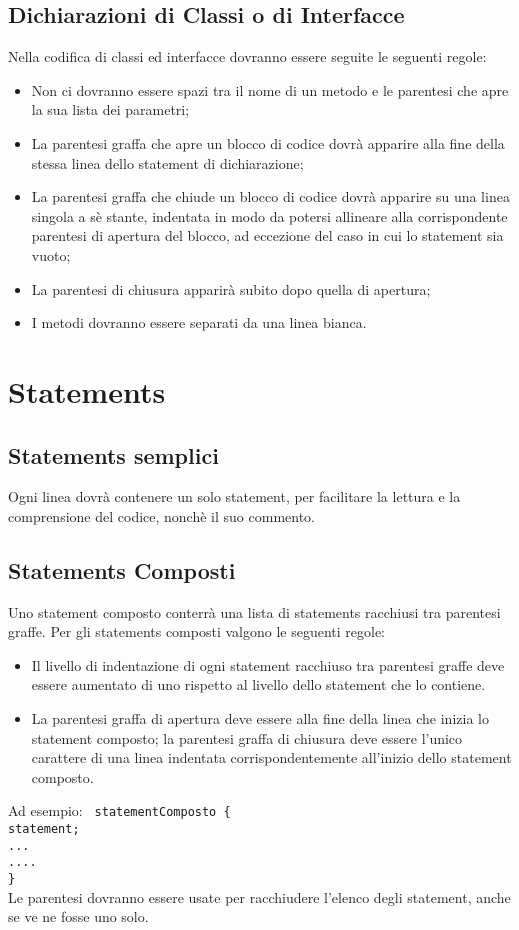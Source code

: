 \subsection{Dichiarazioni di Classi o di Interfacce}
Nella codifica di classi ed interfacce dovranno essere seguite le seguenti regole:
\begin{itemize}
\item Non ci dovranno essere spazi tra il nome di un metodo e le parentesi che apre la sua lista dei parametri;
\item La parentesi graffa che apre un blocco di codice dovr\`a apparire alla fine della stessa linea dello statement di dichiarazione;
\item La parentesi graffa che chiude un blocco di codice dovr\`a apparire su una linea singola a s\`e stante, indentata in modo da potersi allineare alla corrispondente parentesi di apertura del blocco, ad eccezione del caso in cui lo statement sia vuoto;
\item La parentesi di chiusura apparir\`a subito dopo quella di apertura;
\item I metodi dovranno essere separati da una linea bianca.
\end{itemize}

\section{Statements}
\subsection{Statements semplici}
Ogni linea dovr\`a contenere un solo statement, per facilitare la lettura e la comprensione del codice, nonch\`e il suo commento.
\subsection{Statements Composti}
Uno statement composto conterr\`a una lista di statements racchiusi tra parentesi graffe. Per gli statements composti valgono le seguenti regole:
\begin{itemize}
\item Il livello di indentazione di ogni statement racchiuso tra parentesi graffe deve essere aumentato di uno rispetto al livello dello statement che lo contiene.
\item La parentesi graffa di apertura deve essere alla fine della linea che inizia lo statement composto; la parentesi graffa di chiusura deve essere l'unico carattere di una linea indentata corrispondentemente all'inizio dello statement composto.\newline
\end{itemize}
Ad esempio:\newline
	\newline
	\texttt{
	statementComposto \{ \\
	\phantom{....}statement;\\
	\phantom{....}... \\
	\phantom{....}.... \\
	\}
} \\
 \newline
Le parentesi dovranno essere usate per racchiudere l'elenco degli statement, anche se ve ne fosse uno solo.
